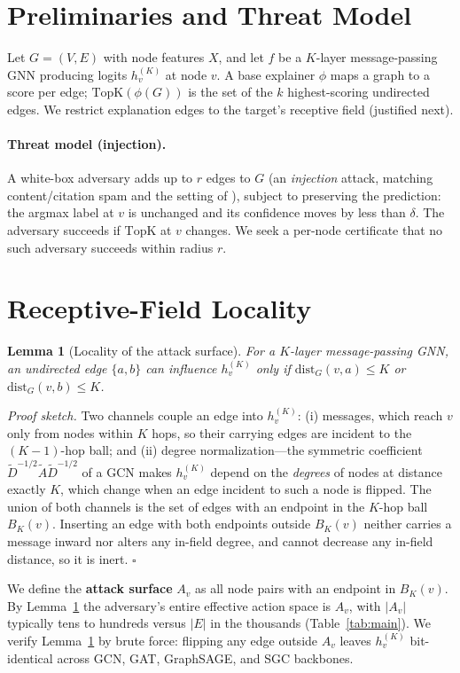 \documentclass[11pt]{article}
\newtheorem{lemma}{Lemma}
\begin{document}
\section{Preliminaries and Threat Model}
Let $G=(V,E)$ with node features $X$, and let $f$ be a $K$-layer message-passing
GNN producing logits $h_v^{(K)}$ at node $v$. A base explainer $\phi$ maps a graph
to a score per edge; $\mathrm{TopK}(\phi(G))$ is the set of the $k$ highest-scoring
undirected edges. We restrict explanation edges to the target's receptive field
(justified next).

\paragraph{Threat model (injection).} A white-box adversary adds up to $r$ edges
to $G$ (an \emph{injection} attack, matching content/citation spam and the
setting of \citet{li2024gxattack}), subject to preserving the prediction: the
argmax label at $v$ is unchanged and its confidence moves by less than $\delta$.
The adversary succeeds if $\mathrm{TopK}$ at $v$ changes. We seek a per-node
certificate that no such adversary succeeds within radius $r$.

\section{Receptive-Field Locality}
\begin{lemma}[Locality of the attack surface]\label{lem:locality}
For a $K$-layer message-passing GNN, an undirected edge $\{a,b\}$ can influence
$h_v^{(K)}$ only if $\mathrm{dist}_G(v,a)\le K$ or $\mathrm{dist}_G(v,b)\le K$.
\end{lemma}
\emph{Proof sketch.} Two channels couple an edge into $h_v^{(K)}$: (i) messages,
which reach $v$ only from nodes within $K$ hops, so their carrying edges are
incident to the $(K{-}1)$-hop ball; and (ii) degree normalization---the symmetric
coefficient $\tilde D^{-1/2}\tilde A\tilde D^{-1/2}$ of a GCN makes $h_v^{(K)}$
depend on the \emph{degrees} of nodes at distance exactly $K$, which change when
an edge incident to such a node is flipped. The union of both channels is the set
of edges with an endpoint in the $K$-hop ball $B_K(v)$. Inserting an edge with
both endpoints outside $B_K(v)$ neither carries a message inward nor alters any
in-field degree, and cannot decrease any in-field distance, so it is inert.
$\square$

We define the \textbf{attack surface} $A_v$ as all node pairs with an endpoint in
$B_K(v)$. By Lemma~\ref{lem:locality} the adversary's entire effective action
space is $A_v$, with $|A_v|$ typically tens to hundreds versus $|E|$ in the
thousands (Table~\ref{tab:main}). We verify Lemma~\ref{lem:locality} by brute
force: flipping any edge outside $A_v$ leaves $h_v^{(K)}$ bit-identical across
GCN, GAT, GraphSAGE, and SGC backbones.
\end{document}
